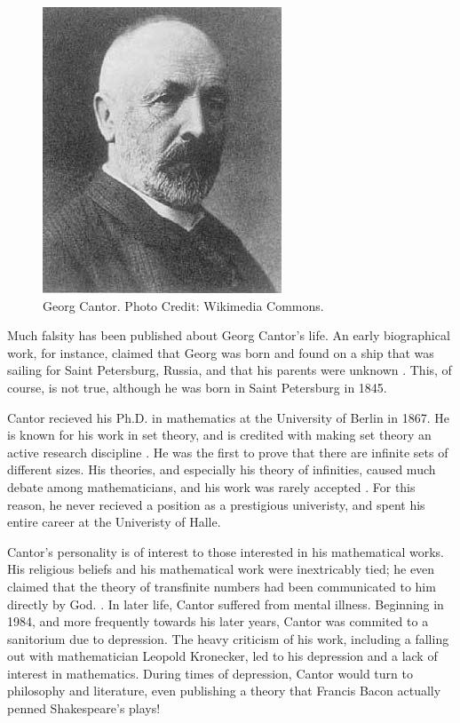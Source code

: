 \documentclass[../../../include/open-logic-section]{subfiles}
\begin{document}

\begin{figure}[h!] 
\centering 
\includegraphics[scale=.75]{georg-cantor.png}
\caption{Georg Cantor. Photo Credit: Wikimedia Commons.} 
\end{figure}

Much falsity has been published about Georg Cantor's life. An early
biographical work, for instance, claimed that Georg was born and found on a
ship that was sailing for Saint Petersburg, Russia, and that his parents
were unknown \citep[352]{Grattan-Guinness1971}. This, of course, is not
true, although he was born in Saint Petersburg in 1845.

Cantor recieved his Ph.D. in mathematics at the University of Berlin in
1867. He is known for his work in set theory, and is credited with making
set theory an active research discipline \citep[353]{Grattan-Guinness1971}.
He was the first to prove that there are infinite sets of different sizes.
His theories, and especially his theory of infinities, caused much debate
among mathematicians, and his work was rarely accepted
\citep[353]{Grattan-Guinness1971}. For this reason, he never recieved a
position as a prestigious univeristy, and spent his entire career at the
Univeristy of Halle.

Cantor's personality is of interest to those interested in his mathematical
works. His religious beliefs and his mathematical work were inextricably
tied; he even claimed that the theory of transfinite numbers had been
communicated to him directly by God. \citep[8]{Dauben2004}. In later life,
Cantor suffered from mental illness. Beginning in 1984, and more frequently
towards his later years, Cantor was commited to a sanitorium due to
depression. The heavy criticism of his work, including a falling out with
mathematician Leopold Kronecker, led to his depression and a lack of
interest in mathematics. During times of depression, Cantor would turn to
philosophy and literature, even publishing a theory that Francis Bacon
actually penned Shakespeare's plays!
\end{document}
